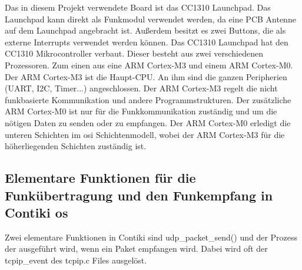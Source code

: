 	Das in diesem Projekt verwendete Board ist das CC1310 Launchpad. Das Launchpad kann direkt als Funkmodul verwendet werden, da eine PCB Antenne auf dem Launchpad angebracht ist. Außerdem besitzt es zwei Buttons, die als externe Interrupts verwendet werden können. Das CC1310 Launchpad hat den CC1310 Mikrocontroller verbaut. Dieser besteht aus zwei verschiedenen Prozessoren. Zum einen aus eine ARM Cortex-M3 und einem ARM Cortex-M0. Der ARM Cortex-M3 ist die Haupt-CPU. An ihm sind die ganzen Peripherien (UART, I2C, Timer...) angeschlossen. Der ARM Cortex-M3 regelt die nicht funkbasierte Kommunikation und andere Programmstrukturen. Der zusätzliche ARM Cortex-M0 ist nur für die Funkkommunikation zuständig und um die nötigen Daten zu senden oder zu empfangen. Der ARM Cortex-M0 erledigt die unteren Schichten im \ac{osi} Schichtenmodell, wobei der ARM Cortex-M3 für die höherliegenden Schichten zuständig ist.
	\subsection{Elementare Funktionen für die Funkübertragung und den Funkempfang in Contiki \ac{os}}
	Zwei elementare Funktionen in Contiki sind udp\_packet\_send() und der Prozess der ausgeführt wird, wenn ein Paket empfangen wird. Dabei wird oft der tcpip\_event des tcpip.c Files ausgelöst.
	
